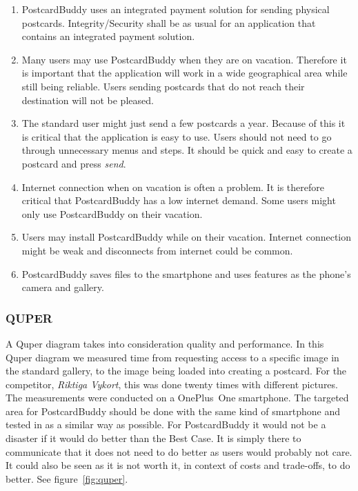 \documentclass[10pt,a4paper]{article}
\begin{document}
\begin{enumerate}
\item PostcardBuddy uses an integrated payment solution for sending physical postcards. Integrity/Security shall be as usual for an application that contains an integrated payment solution.
\item Many users may use PostcardBuddy when they are on vacation. Therefore it is important that the application will work in a wide geographical area while still being reliable. Users sending postcards that do not reach their destination will not be pleased.
\item The standard user might just send a few postcards a year. Because of this it is critical that the application is easy to use. Users should not need to go through unnecessary menus and steps. It should be quick and easy to create a postcard and press \textit{send}.
\item Internet connection when on vacation is often a problem. It is therefore critical that PostcardBuddy has a low internet demand. Some users might only use PostcardBuddy on their vacation.
\item Users may install PostcardBuddy while on their vacation. Internet connection might be weak and disconnects from internet could be common.%
\item PostcardBuddy saves files to the smartphone and uses features as the phone's camera and gallery.
\end{enumerate}

\subsubsection{QUPER}
A Quper diagram takes into consideration quality and performance. In this Quper diagram we measured time from requesting access to a specific image in the standard gallery, to the image being loaded into creating a postcard. For the competitor, \textit{Riktiga Vykort}, this was done twenty times with different pictures. 
The measurements were conducted on a OnePlus~One smartphone. The targeted area for PostcardBuddy should be done with the same kind of smartphone and tested in as a similar way as possible. For PostcardBuddy it would not be a disaster if it would do better than the Best Case. It is simply there to communicate that it does not need to do better as users would probably not care. It could also be seen as it is not worth it, in context of costs and trade-offs, to do better.
See figure~\ref{fig:quper}.
\end{document}
